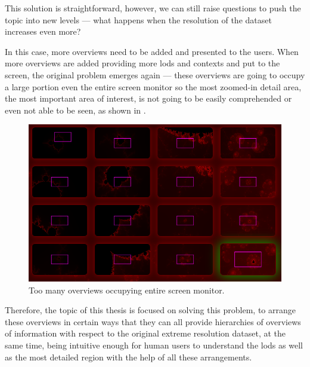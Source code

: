 This solution is straightforward, however, we can still raise questions to push the topic into new levels --- what happens when the resolution of the dataset increases even more?

In this case, more overviews need to be added and presented to the users. When more overviews are added providing more \glspl{lod} and contexts and put to the screen, the original problem emerges again --- these overviews are going to occupy a large portion even the entire screen monitor so the most zoomed-in detail area, the most important area of interest, is not going to be easily comprehended or even not able to be seen, as shown in . 

\begin{figure}[H]
\centering
\includegraphics[width=\textwidth,keepaspectratio]{Figures/Chapter1/occupiesscreen.png}
\decoRule
\caption[Occupied Screen]{Too many overviews occupying entire screen monitor.}
\label{fig:occupiesscreen}
\end{figure}

Therefore, the topic of this thesis is focused on solving this problem, to arrange these overviews in certain ways that they can all provide hierarchies of overviews of information with respect to the original extreme resolution dataset, at the same time, being intuitive enough for human users to understand the \glspl{lod} as well as the most detailed region with the help of all these arrangements.


